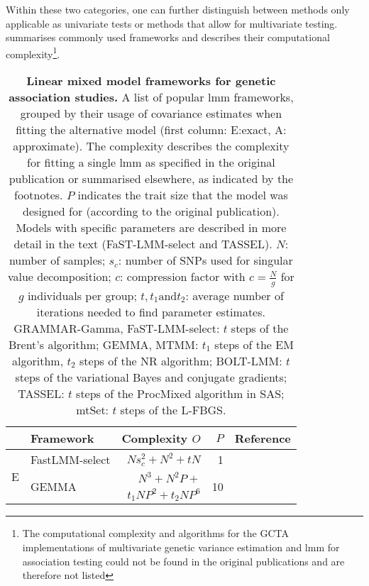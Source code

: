 Within these two categories, one can further distinguish between methods only applicable as univariate tests or methods that allow for multivariate testing.  summarises commonly used frameworks and describes their computational complexity\footnote{The computational complexity and algorithms for the GCTA implementations \citep{Yang2011} of multivariate genetic variance estimation \citep{Lee2012} and \gls{lmm} for association testing \citep{Yang2014} could not be found in the original publications and are therefore not listed}.
\\
\begin{table}[h]
  \centering
  \caption[\textbf{Linear mixed model frameworks for genetic association studies.}]{\textbf{Linear mixed model frameworks for genetic association studies.} A list of popular \gls{lmm} frameworks, grouped by their usage of covariance estimates when fitting the alternative model (first column: E:exact, A: approximate). The complexity describes the complexity for fitting a single \gls{lmm} as specified in the original publication or summarised elsewhere, as indicated by the footnotes. \(P\) indicates the trait size that the model was designed for (according to the original publication). Models with specific parameters are described in more detail in the text (FaST-LMM-select and TASSEL). \(N\): number of samples;  \(s_c\): number of SNPs used for singular value decomposition; \(c\):  compression factor with \(c=\frac{N}{g}\) for \(g\) individuals per group; \(t, t_1 \text{and} t_2\): average number of iterations needed to find parameter estimates. GRAMMAR-Gamma, FaST-LMM-select: \(t\) steps of the Brent's algorithm;  GEMMA, MTMM: \(t_1\) steps of the EM algorithm, \(t_2\) steps of the NR algorithm; BOLT-LMM: \(t\) steps of the variational Bayes and conjugate gradients; TASSEL: \(t\) steps of the ProcMixed algorithm in SAS; mtSet: \(t\) steps of the L-FBGS.}
  \begin{small}
     \begin{tabular}{llrrr}
    \toprule
     & Framework & Complexity \(O\) & \(P\) & Reference \\
    \midrule
    \multirow{3}[1]{*}{E} & FastLMM-select & \(Ns_c^2 + N^2 + tN\) & \num{1} & \citep{Lippert2011} \\
          & \multicolumn{1}{l}{\multirow{2}[0]{*}{GEMMA}} & \(N^3 + N^2P  + \)&  \multirow{2}[0]{*}{\num{10}} & \citep{Zhou2014} \\
          \addlinespace[-.2ex]
          & & \( t_1NP^2 + t_2NP^6\) & &\citep{Zhou2014} \\

\end{tabular}
\end{small}
\end{table}
